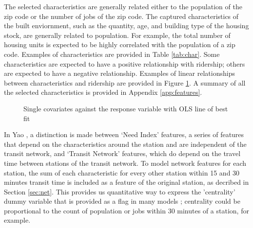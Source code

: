 \documentclass[11pt]{article}
\begin{document}
The selected characteristics are generally related either to the population of the zip code or the number of jobs of the zip code. The captured characteristics of the built enviornment, such as the quantity, age, and building type of the housing stock, are generally related to population. For example, the total number of housing units is expected to be highly correlated with the population of a zip code.  Examples of characteristics are provided in Table \ref{tab:char}. Some characteristics are expected to have a positive relationship with ridership; others are expected to have a negative relationship. Examples of linear relationships between characteristics and ridership are provided in Figure \ref{fig:chartypes}. A summary of all the selected characteristics is provided in Appendix \ref{app:features}.



\begin{figure}[H]
\centering
{}
\caption{Single covariates against the response variable with OLS line of best fit}\label{fig:chartypes}
\end{figure}


In Yao \cite{Yao2007}, a distinction is made between `Need Index' features, a series of features that depend on the characteristics around the station and are independent of the transit network, and `Transit Network' features, which do depend on the travel time between stations of the transit network. To model network features for each station, the sum of each characteristic for every other station within 15 and 30 minutes transit time is included as a feature of the original station, as decribed in Section \ref{sec:net}. This provides us quantitative way to express the 'centrality' dummy variable that is provided as a flag in many models \cite{Kuby2004, Durning2015}; centrality could be proportional to the count of population or jobs within 30 minutes of a station, for example. 
\end{document}
